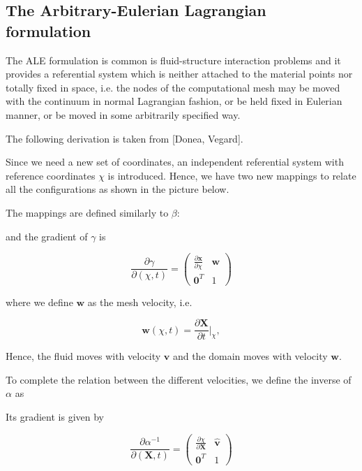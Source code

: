 \documentclass[a4paper,11pt,openright,twoside]{book}
\begin{document}
\subsection{The Arbitrary-Eulerian Lagrangian formulation}
The ALE formulation is common is fluid-structure interaction problems and it provides a referential system which is neither attached to the material points nor totally fixed in space, i.e. the nodes of the computational mesh may be moved with the continuum in normal Lagrangian fashion, or be held fixed in Eulerian manner, or be moved in some arbitrarily specified way.

The following derivation is taken from [Donea, Vegard].

Since we need a new set of coordinates, an independent referential system with reference coordinates $\chi$ is introduced. Hence, we have two new mappings to relate all the configurations as shown in the picture below.


The mappings are defined similarly to $\beta$:


and the gradient of $\gamma$ is 

\begin{equation}
\frac{\partial \gamma}{\partial(\chi, t)} = 
\begin{pmatrix}
\frac{\partial \mathbf{x}}{\partial \chi} & \mathbf{w} \\
\mathbf{0}^T & 1
\end{pmatrix}
\end{equation}

where we define $\mathbf{w}$ as the mesh velocity, i.e.

\begin{equation}
\mathbf{w}(\chi, t) = \frac{\partial \mathbf{X}}{\partial t}|_\chi,
\end{equation}

Hence, the fluid moves with velocity $\mathbf{v}$ and the domain moves with velocity $\mathbf{w}$.

To complete the relation between the different velocities, we define the inverse of $\alpha$ as


Its gradient is given by

\begin{equation}
\frac{\partial \alpha^{-1}}{\partial(\mathbf{X}, t)} = 
\begin{pmatrix}
\frac{\partial \chi}{\partial \mathbf{X}} & \hat{\mathbf{v}}\\
\mathbf{0}^T & 1
\end{pmatrix}
\end{equation}
\end{document}
